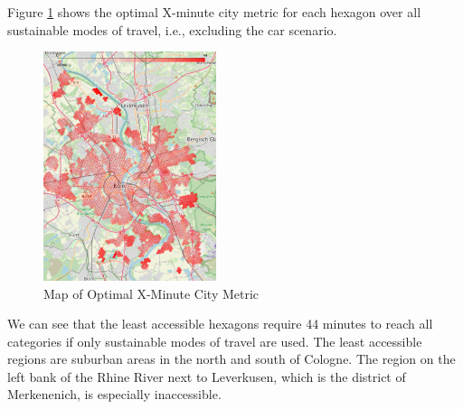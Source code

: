 Figure \ref{fig:optimal_map} shows the optimal X-minute city metric for each hexagon over all sustainable modes of travel, i.e., excluding the car scenario.
\begin{figure}
  \begin{center}
    \includegraphics[width=0.45\textwidth]{Figures/results/minute_city_metric/optimal_map}
  \end{center}
  \caption{Map of Optimal X-Minute City Metric}
  \label{fig:optimal_map}
\end{figure}
We can see that the least accessible hexagons require 44 minutes to reach all categories if only sustainable modes of travel are used.
The least accessible regions are suburban areas in the north and south of Cologne. 
The region on the left bank of the Rhine River next to Leverkusen, which is the district of Merkenenich, is especially inaccessible.

